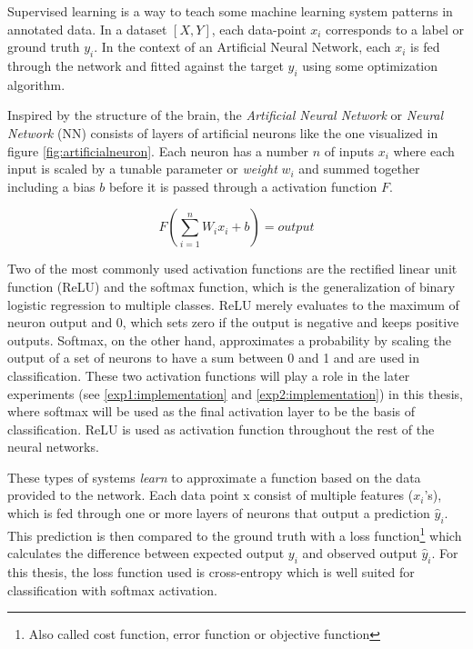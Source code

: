 Supervised learning is a way to teach some machine learning system patterns in annotated data. In a dataset \(\left [X, Y \right] \), each data-point \(x_{i}\) corresponds to a label or ground truth \(y_{i}\). In the context of an Artificial Neural Network, each \(x_{i}\) is fed through the network and fitted against the target \(y_{i}\) using some optimization algorithm. 

Inspired by the structure of the brain, the \textit{Artificial Neural Network} or \textit{Neural Network} (NN) consists of layers of artificial neurons like the one visualized in figure \ref{fig:artificialneuron}. Each neuron has a number \(n\) of inputs \(x_{i}\) where each input is scaled by a tunable parameter or \textit{weight} \(w_{i}\) and summed together including a bias \(b\) before it is passed through a activation function \(F\).

\begin{equation}
    F(\sum_{i=1}^{n}W_{i}x_{i} + b) = output
\end{equation}

Two of the most commonly used activation functions are the rectified linear unit function (ReLU) and the softmax function, which is the generalization of binary logistic regression to multiple classes. ReLU merely evaluates to the maximum of neuron output and 0, which sets zero if the output is negative and keeps positive outputs. Softmax, on the other hand, approximates a probability by scaling the output of a set of neurons to have a sum between 0 and 1 and are used in classification. These two activation functions will play a role in the later experiments (see \ref{exp1:implementation} and \ref{exp2:implementation}) in this thesis, where softmax will be used as the final activation layer to be the basis of classification. ReLU is used as activation function throughout the rest of the neural networks. 

These types of systems \textit{learn} to approximate a function based on the data provided to the network. Each data point x consist of multiple features (\(x_{i}\)'s), which is fed through one or more layers of neurons that output a prediction \(\hat{y}_{i}\). This prediction is then compared to the ground truth with a loss function\footnote{Also called cost function, error function or objective function} which calculates the difference between expected output \(y_{i}\) and observed output \(\hat{y}_{i}\).
For this thesis, the loss function used is cross-entropy which is well suited for classification with softmax activation\cite{softmaxcrossentropy}.

